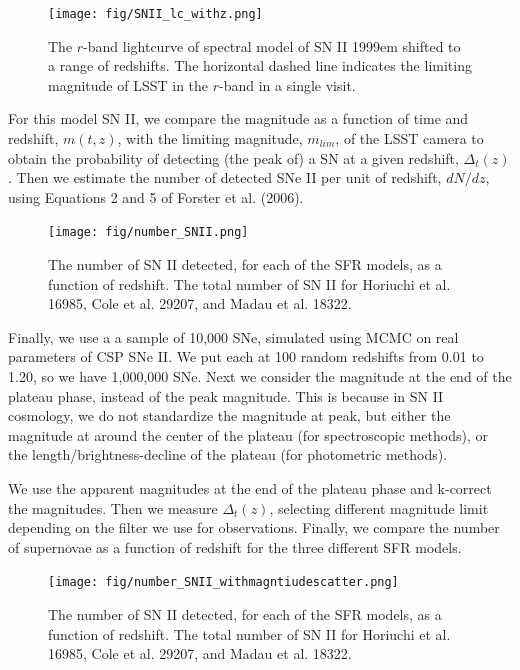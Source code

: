 \documentclass[12pt, twocolumn]{emulateapj}
\begin{document}
\begin{appendix}
\begin{figure}
	\begin{center}
		\texttt{[image: fig/SNII\_lc\_withz.png]}
		\caption{The $r$-band lightcurve of spectral model of SN II 1999em shifted to a range of redshifts. 
		The horizontal dashed line indicates the limiting magnitude of LSST in the $r$-band in a single visit.}
		\label{fig:SNII_lc_withz}
	\end{center}
\end{figure}

For this model SN II, we compare the magnitude as a function of time and redshift, $m(t,z)$, with the limiting magnitude, $m_{lim}$, of the LSST camera to obtain the probability of detecting (the peak of) a SN at a given redshift, $\Delta_{t}(z)$. 
Then we estimate the number of detected SNe II per unit of redshift, $dN/dz$, using Equations 2 and 5 of Forster et al. (2006).

\begin{figure}
	\begin{center}
		\texttt{[image: fig/number\_SNII.png]}
		\caption{The number of SN II detected, for each of the SFR models, as a function of redshift. 
		The total number of SN II for Horiuchi et al. 16985, Cole et al. 29207, and Madau et al.  18322. }
		\label{fig:SNII_lc_sfr}
	\end{center}
\end{figure}

Finally, we use a a sample of 10,000 SNe, simulated using MCMC on real parameters of CSP SNe II. 
We put each at 100 random redshifts from 0.01 to 1.20, so we have 1,000,000 SNe. 
Next we consider the magnitude at the end of the plateau phase, instead of the peak magnitude. 
This is because in SN II cosmology, we do not standardize the magnitude at peak, but either the magnitude at around the center of the plateau (for spectroscopic methods), or the length/brightness-decline of the plateau (for photometric methods).

We use the apparent magnitudes at the end of the plateau phase and k-correct the magnitudes. 
Then we measure $\Delta_t(z)$, selecting different magnitude limit depending on the filter we use for observations. 
Finally, we compare the number of supernovae as a function of redshift for the three different SFR models.

\begin{figure}
	\begin{center}
		\texttt{[image: fig/number\_SNII\_withmagntiudescatter.png]}
		\caption{The number of SN II detected, for each of the SFR models, as a function of redshift. 
		The total number of SN II for Horiuchi et al. 16985, Cole et al. 29207, and Madau et al.  18322. }
		\label{fig:SNII_lc_wz}
	\end{center}
\end{figure}


\end{appendix}
\end{document}
